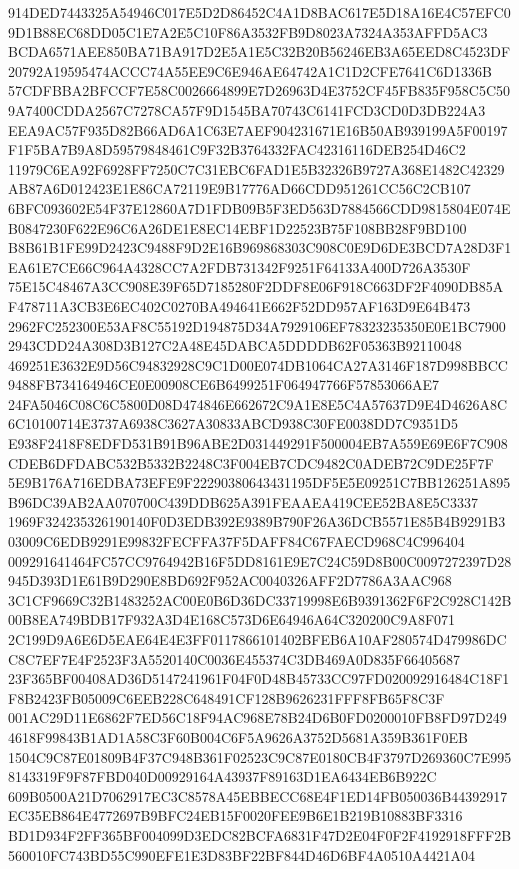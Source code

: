 \documentclass[UTF8,fontset=fandol,zihao=-4,a4paper]{ctexart}
\begin{document}
{{914DED7443325A54946C017E5D2D86452C4A1D8BAC617E5D18A16E4C57EFC09D1B88EC68DD05C1E7A2E5C10F86A3532FB9D8023A7324A353AFFD5AC3
BCDA6571AEE850BA71BA917D2E5A1E5C32B20B56246EB3A65EED8C4523DF20792A19595474ACCC74A55EE9C6E946AE64742A1C1D2CFE7641C6D1336B
57CDFBBA2BFCCF7E58C0026664899E7D26963D4E3752CF45FB835F958C5C509A7400CDDA2567C7278CA57F9D1545BA70743C6141FCD3CD0D3DB224A3
EEA9AC57F935D82B66AD6A1C63E7AEF904231671E16B50AB939199A5F00197F1F5BA7B9A8D59579848461C9F32B3764332FAC42316116DEB254D46C2
11979C6EA92F6928FF7250C7C31EBC6FAD1E5B32326B9727A368E1482C42329AB87A6D012423E1E86CA72119E9B17776AD66CDD951261CC56C2CB107
6BFC093602E54F37E12860A7D1FDB09B5F3ED563D7884566CDD9815804E074EB0847230F622E96C6A26DE1E8EC14EBF1D22523B75F108BB28F9BD100
B8B61B1FE99D2423C9488F9D2E16B969868303C908C0E9D6DE3BCD7A28D3F1EA61E7CE66C964A4328CC7A2FDB731342F9251F64133A400D726A3530F
75E15C48467A3CC908E39F65D7185280F2DDF8E06F918C663DF2F4090DB85AF478711A3CB3E6EC402C0270BA494641E662F52DD957AF163D9E64B473
2962FC252300E53AF8C55192D194875D34A7929106EF78323235350E0E1BC79002943CDD24A308D3B127C2A48E45DABCA5DDDDB62F05363B92110048
469251E3632E9D56C94832928C9C1D00E074DB1064CA27A3146F187D998BBCC9488FB734164946CE0E00908CE6B6499251F064947766F57853066AE7
24FA5046C08C6C5800D08D474846E662672C9A1E8E5C4A57637D9E4D4626A8C6C10100714E3737A6938C3627A30833ABCD938C30FE0038DD7C9351D5
E938F2418F8EDFD531B91B96ABE2D031449291F500004EB7A559E69E6F7C908CDEB6DFDABC532B5332B2248C3F004EB7CDC9482C0ADEB72C9DE25F7F
5E9B176A716EDBA73EFE9F22290380643431195DF5E5E09251C7BB126251A895B96DC39AB2AA070700C439DDB625A391FEAAEA419CEE52BA8E5C3337
1969F324235326190140F0D3EDB392E9389B790F26A36DCB5571E85B4B9291B303009C6EDB9291E99832FECFFA37F5DAFF84C67FAECD968C4C996404
009291641464FC57CC9764942B16F5DD8161E9E7C24C59D8B00C0097272397D28945D393D1E61B9D290E8BD692F952AC0040326AFF2D7786A3AAC968
3C1CF9669C32B1483252AC00E0B6D36DC33719998E6B9391362F6F2C928C142B00B8EA749BDB17F932A3D4E168C573D6E64946A64C320200C9A8F071
2C199D9A6E6D5EAE64E4E3FF0117866101402BFEB6A10AF280574D479986DCC8C7EF7E4F2523F3A5520140C0036E455374C3DB469A0D835F66405687
23F365BF00408AD36D5147241961F04F0D48B45733CC97FD020092916484C18F1F8B2423FB05009C6EEB228C648491CF128B9626231FFF8FB65F8C3F
001AC29D11E6862F7ED56C18F94AC968E78B24D6B0FD0200010FB8FD97D2494618F99843B1AD1A58C3F60B004C6F5A9626A3752D5681A359B361F0EB
1504C9C87E01809B4F37C948B361F02523C9C87E0180CB4F3797D269360C7E9958143319F9F87FBD040D00929164A43937F89163D1EA6434EB6B922C
609B0500A21D7062917EC3C8578A45EBBECC68E4F1ED14FB050036B44392917EC35EB864E4772697B9BFC24EB15F0020FEE9B6E1B219B10883BF3316
BD1D934F2FF365BF004099D3EDC82BCFA6831F47D2E04F0F2F4192918FFF2B560010FC743BD55C990EFE1E3D83BF22BF844D46D6BF4A0510A4421A04
}}
\end{document}

